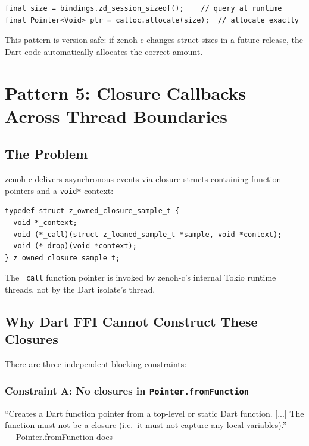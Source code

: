 \documentclass[11pt,a4paper]{article}
\newcommand{\code}[1]{\texttt{#1}}
\newcommand{\fn}[1]{\texttt{#1}}
\begin{document}
\begin{lstlisting}[style=dartstyle]
final size = bindings.zd_session_sizeof();    // query at runtime
final Pointer<Void> ptr = calloc.allocate(size);  // allocate exactly
\end{lstlisting}

This pattern is version-safe: if zenoh-c changes struct sizes in a future
release, the Dart code automatically allocates the correct amount.


\section{Pattern 5: Closure Callbacks Across Thread Boundaries}
\label{sec:pattern5}

\subsection{The Problem}

zenoh-c delivers asynchronous events via closure structs containing function
pointers and a \code{void*} context:

\begin{lstlisting}[style=cstyle]
typedef struct z_owned_closure_sample_t {
  void *_context;
  void (*_call)(struct z_loaned_sample_t *sample, void *context);
  void (*_drop)(void *context);
} z_owned_closure_sample_t;
\end{lstlisting}

The \fn{\_call} function pointer is invoked by zenoh-c's internal Tokio
runtime threads, not by the Dart isolate's thread.


\subsection{Why Dart FFI Cannot Construct These Closures}

There are three independent blocking constraints:

\subsubsection{Constraint A: No closures in \code{Pointer.fromFunction}}

\begin{quotebox}
``Creates a Dart function pointer from a top-level or static Dart function.
{[...]} The function must not be a closure (i.e.\ it must not capture any
local variables).''\\
--- \href{https://api.dart.dev/stable/latest/dart-ffi/Pointer/fromFunction.html}{Pointer.fromFunction docs}
\end{quotebox}
\end{document}
